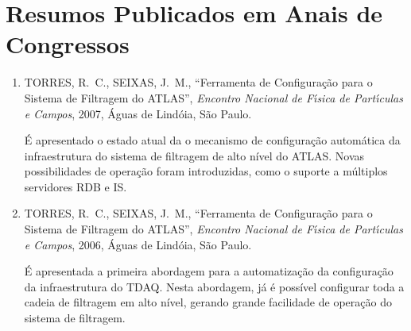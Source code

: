 \section{Resumos Publicados em Anais de Congressos}

\begin{enumerate}

\item \MakeUppercase{ Torres, R.~C., Seixas, J.~M.}, \enquote{Ferramenta de
  Configura{\c c}{\~a}o para o Sistema de Filtragem do {ATLAS}}, {\em Encontro
  Nacional de F{\'\i}sica de Part{\'\i}culas e Campos\/}, 2007, Águas de Lindóia, São Paulo.
  
  É apresentado o estado atual da o mecanismo de configuração automática da infraestrutura do sistema de filtragem de alto nível do ATLAS. Novas possibilidades de operação foram introduzidas, como o suporte a múltiplos servidores RDB e IS.

\item \MakeUppercase{ Torres, R.~C., Seixas, J.~M.}, \enquote{Ferramenta de
  Configura{\c c}{\~a}o para o Sistema de Filtragem do {ATLAS}}, {\em Encontro
  Nacional de F{\'\i}sica de Part{\'\i}culas e Campos\/}, 2006, Águas de Lindóia, São Paulo.

  É apresentada a primeira abordagem para a automatização da configuração da infraestrutura do TDAQ. Nesta abordagem, já é possível configurar toda a cadeia de filtragem em alto nível, gerando grande facilidade de operação do sistema de filtragem.


\end{enumerate}